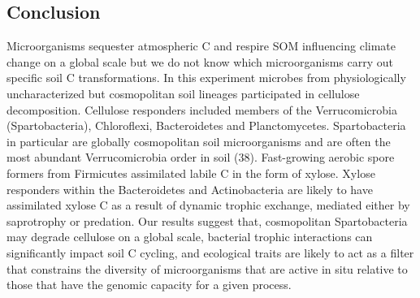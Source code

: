 \subsection{Conclusion} 
Microorganisms sequester atmospheric C and respire SOM influencing climate
change on a global scale but we do not know which microorganisms carry out
specific soil C transformations. In this experiment microbes from
physiologically uncharacterized but cosmopolitan soil lineages participated in
cellulose decomposition. Cellulose responders included members of the
Verrucomicrobia (Spartobacteria), Chloroflexi, Bacteroidetes and
Planctomycetes. Spartobacteria in particular are globally cosmopolitan soil
microorganisms and are often the most abundant Verrucomicrobia order in soil
(38). Fast-growing aerobic spore formers from Firmicutes assimilated labile
C in the form of xylose. Xylose responders within the Bacteroidetes and
Actinobacteria are likely to have assimilated xylose C as a result of dynamic
trophic exchange, mediated either by saprotrophy or predation. Our results
suggest that, cosmopolitan Spartobacteria may degrade cellulose on a global
scale, bacterial trophic interactions can significantly impact soil C cycling,
and ecological traits are likely to act as a filter that constrains the
diversity of microorganisms that are active in situ relative to those that have
the genomic capacity for a given process.
